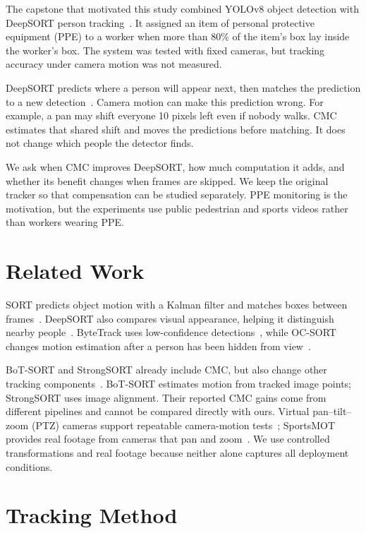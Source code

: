 \documentclass[conference]{IEEEtran}
\begin{document}
The capstone that motivated this study combined YOLOv8 object detection with DeepSORT person tracking~\cite{qamhieh2025capstone}. It assigned an item of personal protective equipment (PPE) to a worker when more than 80\% of the item's box lay inside the worker's box. The system was tested with fixed cameras, but tracking accuracy under camera motion was not measured.

DeepSORT predicts where a person will appear next, then matches the prediction to a new detection~\cite{wojke2017deepsort}. Camera motion can make this prediction wrong. For example, a pan may shift everyone 10 pixels left even if nobody walks. CMC estimates that shared shift and moves the predictions before matching. It does not change which people the detector finds.

We ask when CMC improves DeepSORT, how much computation it adds, and whether its benefit changes when frames are skipped. We keep the original tracker so that compensation can be studied separately. PPE monitoring is the motivation, but the experiments use public pedestrian and sports videos rather than workers wearing PPE.

\section{Related Work}
SORT predicts object motion with a Kalman filter and matches boxes between frames~\cite{bewley2016sort,kalman1960}. DeepSORT also compares visual appearance, helping it distinguish nearby people~\cite{wojke2017deepsort}. ByteTrack uses low-confidence detections~\cite{zhang2022bytetrack}, while OC-SORT changes motion estimation after a person has been hidden from view~\cite{cao2023ocsort}.

BoT-SORT and StrongSORT already include CMC, but also change other tracking components~\cite{aharon2022botsort,du2023strongsort}. BoT-SORT estimates motion from tracked image points; StrongSORT uses image alignment. Their reported CMC gains come from different pipelines and cannot be compared directly with ours. Virtual pan--tilt--zoom (PTZ) cameras support repeatable camera-motion tests~\cite{chen2015ptz}; SportsMOT provides real footage from cameras that pan and zoom~\cite{cui2023sportsmot}. We use controlled transformations and real footage because neither alone captures all deployment conditions.

\section{Tracking Method}
\end{document}
